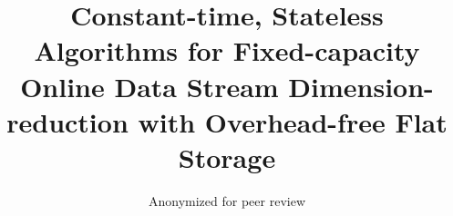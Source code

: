 \title{ Constant-time, Stateless Algorithms for Fixed-capacity Online Data Stream Dimension-reduction with Overhead-free Flat Storage }

\author[]{Anonymized for peer review}

\maketitle
